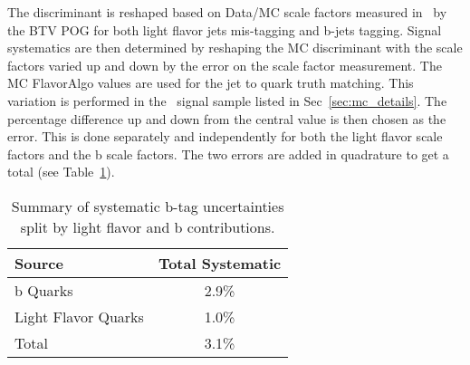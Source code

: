 The discriminant is reshaped based on Data/MC scale factors measured in~\cite{BTV11003} by the BTV POG for both light flavor jets mis-tagging and b-jets tagging. Signal systematics are then determined by reshaping the MC discriminant with the scale factors varied up and down by the error on the scale factor measurement. The MC FlavorAlgo values are used for the jet to quark truth matching. This variation is performed in the \ttZ \ signal sample listed in Sec~\ref{sec:mc_details}. The percentage difference up and down from the central value is then chosen as the error. This is done separately and independently for both the light flavor scale factors and the b scale factors. The two errors are added in quadrature to get a total (see Table~\ref{tab:systbTag}).


\begin{table}[h]
\begin{center}

\begin{tabular}{lc}\hline
Source & Total Systematic \\ \hline
b Quarks & 2.9\% \\
Light Flavor Quarks & 1.0\% \\ \hline
Total & 3.1\% \\
\hline
\end{tabular}
\caption{\label{tab:systbTag} Summary of systematic b-tag uncertainties split by light flavor and b contributions.}
\end{center}
\end{table}

